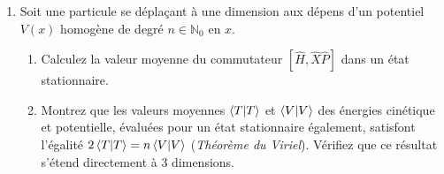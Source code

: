 \begin{enumerate}
\begin{enumerate}
\end{enumerate}
\item Soit une particule se déplaçant à une dimension aux dépens d'un potentiel $V(x)$ homogène de degré $n\in\mathbb N_0$ en $x$. 
\begin{enumerate}
\item Calculez la valeur moyenne du commutateur $[\hat H,\hat X\hat P]$ dans un état stationnaire.
\item Montrez que les valeurs moyennes $\braket{T}$ et $\braket{V}$ des énergies cinétique et potentielle, évaluées pour un état stationnaire également, satisfont l'égalité $2\braket{T}=n\braket{V}$ (\textit{Théorème du Viriel}). Vérifiez que ce résultat s'étend directement à 3 dimensions.
\end{enumerate}
\end{enumerate}